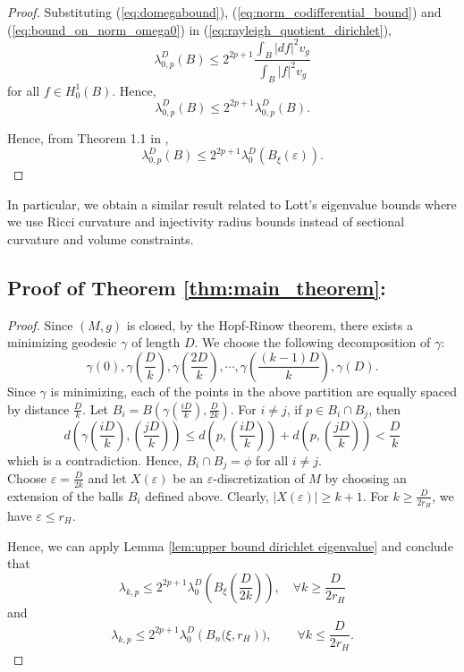 \documentclass[10 pt, reqno]{amsart}
\begin{document}
\begin{proof}
Substituting (\ref{eq:domegabound}), (\ref{eq:norm_codifferential_bound}) and (\ref{eq:bound_on_norm_omega0}) in (\ref{eq:rayleigh_quotient_dirichlet}),
\[\lambda_{0,p}^D(B)\le 2^{2p+1} \frac{\int_B |df|^2v_g}{\int_B|f|^2v_g}\]
for all $f\in H^1_0(B)$. Hence, 
\[\lambda_{0,p}^D(B)\le 2^{2p+1} \lambda_{0,p}^D(B).\] 

Hence, from Theorem 1.1 in \cite{Cheng},
\[\lambda_{0,p}^D(B)\le 2^{2p+1}\lambda_0^D(B_\xi(\varepsilon)).\]

\end{proof}

In particular, we obtain a similar result related to Lott's eigenvalue bounds \cite{LottJ} where we use Ricci curvature and injectivity radius bounds instead of sectional curvature and volume constraints. 
\subsection{Proof of Theorem \ref{thm:main_theorem}:}

\begin{proof}
    Since $(M,g)$ is closed, by the Hopf-Rinow theorem, there exists a minimizing geodesic $\gamma$ of length $D$. We choose the following decomposition of $\gamma$:
    \[\gamma(0),\gamma\left(\frac{D}{k}\right),\gamma\left(\frac{2D}{k}\right),\cdots,\gamma\left(\frac{(k-1)D}{k}\right),\gamma(D).\]
Since $\gamma$ is minimizing, each of the points in the above partition are equally spaced by distance $\frac{D}{k}$. Let $B_i=B\left(\gamma\left(\frac{iD}{k}\right),\frac{D}{2k}\right)$. For $i\neq j$, if $p\in B_i\cap B_j$, then \[d\left(\gamma\left(\frac{iD}{k}\right),\left(\frac{jD}{k}\right)\right)\le d\left(p,\left(\frac{iD}{k}\right)\right)+ d\left(p,\left(\frac{jD}{k}\right)\right)<\frac{D}{k}\] which is a contradiction. Hence, $B_i\cap B_j=\phi$ for all $i\neq j.$ \\ Choose $\varepsilon= \frac{D}{2k}$ and let $X(\varepsilon)$ be an $\varepsilon$-discretization of $M$ by choosing an extension of the balls $B_i$ defined above. Clearly, $|X(\varepsilon)|\ge k+1$. For $k\ge\frac{D}{2r_H}$, we have $\varepsilon\le r_H$. 

Hence, we can apply Lemma \ref{lem:upper bound dirichlet eigenvalue}
and conclude that 
\[\lambda_{k,p}\le 2^{2p+1} \lambda_0^D\left(B_\xi\left(\frac{D}{2k}\right)\right), \quad \forall k\ge \frac{D}{2r_H}\]
and \[\lambda_{k,p}\le 2^{2p+1} \lambda_0^D\left(B_n(\xi,r_H\right)),\qquad \forall k\le \frac{D}{2r_H}.\]
\end{proof}
\end{document}
